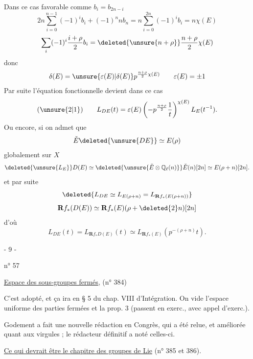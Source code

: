 Dans ce cas favorable
comme $b_i=b_{2n-i}$
\[
2n\sum_{i=0}^{n-1}(-1)^i b_i+(-1)^n n b_n=n\sum_{i=0}^{2n}(-1)^i b_i=n\chi(E)
\]
\[
\sum_i(-1)^i\frac{i+\rho}{2}b_i=\deleted{\unsure{n+\rho}}\frac{n+\rho}{2}\chi(E)
\]
donc
\[
\delta(E)=\unsure{\varepsilon(E)|\delta(E)}p^{\frac{n+\rho}{2}\chi(E)}
\qquad\varepsilon(E)=\pm1
\]
Par suite l'équation fonctionnelle devient dans ce cas
\[
(\unsure{2|1})\qquad L_{DE}(t)=\varepsilon(E)\left(-p^{\frac{n+\rho}{2}}\frac1t\right)^{\chi(E)}L_E(t^{-1}).
\]
Ou encore, si on admet que
\[
\check E\deleted{\unsure{DE}}\simeq E(\rho)
\]
globalement sur $X$ 
\[
\deleted{\unsure{L_E}}D(E)\simeq\deleted{\unsure{\check E\otimes\mathbb Q_\ell(n)}}\check E(n)[2n]\simeq E(\rho+n)[2n].
\]
et par suite
\[
\deleted{L_{DE}\simeq L_{E(\rho+n)}=L_{\mathbf R f_*(E(\rho+n))}}
\]
\[
\mathbf R f_*(D(E))\simeq\mathbf R f_*(E)(\rho+\deleted{2}n)[2n]
\]
d'où
\[
L_{DE}(t)=L_{\mathbf R f_*D(E)}(t)\simeq L_{\mathbf R f_*(E)}\left(p^{-(\rho+n)}t\right).
\]
\begin{center}- 9 -\end{center}
\hfill n° 57

\uline{Espace des sous-groupes fermés}, (n° 384)

C'est adopté, et ça ira en § 5 du chap. VIII d'Intégration. On vide l'espace uniforme des parties fermées et la prop. 3 (passent en exerc., avec appel d'exerc.).

Godement a fait une nouvelle rédaction en Congrès, qui a été relue, et améliorée quant aux virgules ; le rédacteur définitif a noté celles-ci.

\uline{Ce qui devrait être le chapitre des groupes de Lie} (n° 385 et 386).

